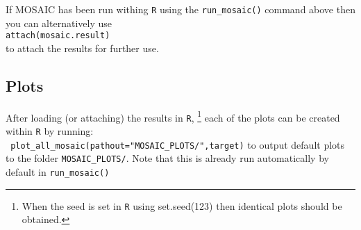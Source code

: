 \documentclass{article}
\begin{document}
If MOSAIC has been run withing \texttt{R} using the \verb+run_mosaic()+ command above then you can alternatively use\\
\verb+attach(mosaic.result)+ \\
to attach the results for further use. 

\subsection{Plots}
After loading (or attaching) the results in \texttt{R},  
\footnote{When the seed is set in \texttt{R} using set.seed(123) then identical plots should be obtained.}
each of the plots can be created within \texttt{R} by running:\\
\verb+ plot_all_mosaic(pathout="MOSAIC_PLOTS/",target)+
to output default plots to the folder \texttt{MOSAIC\_PLOTS/}. 
Note that this is already run automatically by default in \verb+run_mosaic()+
\end{document}

